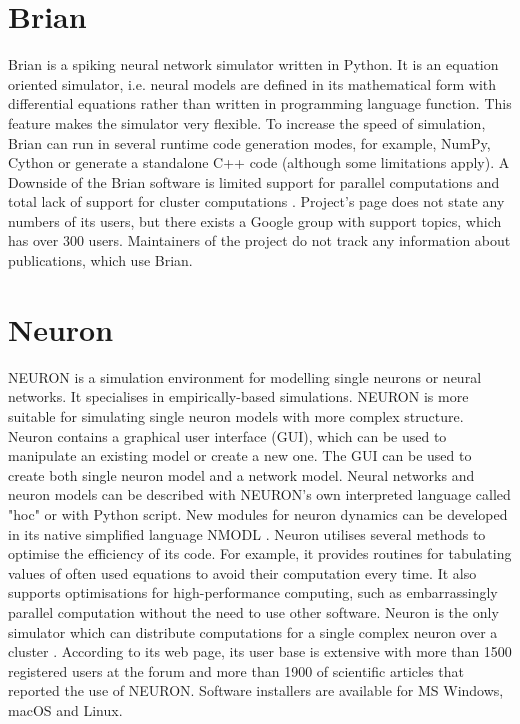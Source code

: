 \section{Brian}

Brian is a spiking neural network simulator written in Python. It is an equation oriented simulator, i.e. neural models are defined in its mathematical form with differential equations rather than written in programming language function. This feature makes the simulator very flexible. To increase the speed of simulation, Brian can run in several runtime code generation modes, for example, NumPy, Cython or generate a standalone C++ code (although some limitations apply). A Downside of the Brian software is limited support for parallel computations and total lack of support for cluster computations \cite{tikidji-hamburyanSoftwareBrainNetwork2017}. Project's page does not state any numbers of its users, but there exists a Google group \cite{Brian} with support topics, which has over 300 users. Maintainers of the project do not track any information about publications, which use Brian.

\section{Neuron}

NEURON is a simulation environment for modelling single neurons or neural networks. It specialises in empirically-based simulations. NEURON is more suitable for simulating single neuron models with more complex structure. Neuron contains a graphical user interface (GUI), which can be used to manipulate an existing model or create a new one. The GUI can be used to create both single neuron model and a network model.  Neural networks and neuron models can be described with NEURON's own interpreted language called "hoc" or with Python script. New modules for neuron dynamics can be developed in its native simplified language NMODL \cite{tikidji-hamburyanSoftwareBrainNetwork2017}. Neuron utilises several methods to optimise the efficiency of its code. For example, it provides routines for tabulating values of often used equations to avoid their computation every time. It also supports optimisations for high-performance computing, such as embarrassingly parallel computation without the need to use other software. Neuron is the only simulator which can distribute computations for a single complex neuron over a cluster \cite{tikidji-hamburyanSoftwareBrainNetwork2017}. According to its web page, its user base is extensive with more than 1500 registered users at the forum and more than 1900 of scientific articles that reported the use of NEURON. Software installers are available for MS Windows, macOS and Linux.

